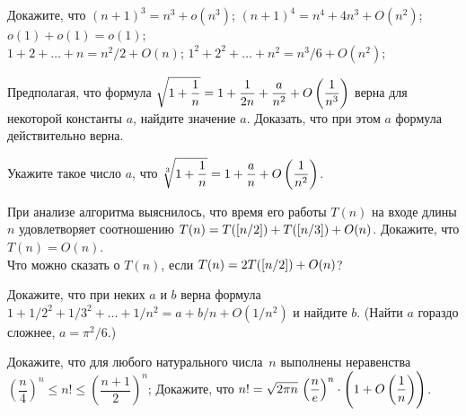 \documentclass[a4paper,12pt]{article}
\begin{document}
Докажите, что
$(n+1)^3 = n^3 + o(n^3)$;
$(n+1)^4 = n^4 + 4 n^3 + O(n^2)$;
$o(1) + o(1) = o(1)$;
\\
$1 + 2 + \ldots + n = n^2/2 + O(n)$;
$1^2 + 2^2 + \ldots + n^2 = n^3/6 + O(n^2)$;

Предполагая, что формула $\sqrt{1+\dfrac1n} = 1 + \dfrac{1}{2n} + \dfrac{a}{n^2} + O\left(\dfrac{1}{n^3}\right)$ верна для некоторой константы $a$, найдите значение $a$.
 Доказать, что при этом $a$ формула действительно верна.

Укажите такое число $a$, что $\sqrt[3]{1+\dfrac1n} = 1 + \dfrac{a}{n} + O\left(\dfrac{1}{n^2}\right)$.

При анализе алгоритма выяснилось, что время его работы $T(n)$ на входе длины $n$ удовлетворяет соотношению $T(n) = T(\left[n/2\right]) + T(\left[n/3\right]) + O(n)$. Докажите, что $T(n) = O(n)$.
\\
Что можно сказать о $T(n)$, если $T(n) = 2T(\left[n/2\right]) + O(n)$?

Докажите, что при неких $a$ и $b$ верна формула 
$1 + 1/2^2 + 1/3^2 + \ldots + 1/n^2 = a + b/n + O(1/n^2)$ и найдите $b$.
(Найти $a$ гораздо сложнее, $a=\pi^2/6$.)


Докажите, что для любого натурального числа~$n$ выполнены неравенства $\left(\dfrac n4\right)^n\leqslant n!\leqslant\left(\dfrac{n+1}2\right)^n$;
Докажите, что $n! = \sqrt{2\pi n}\,\left(\dfrac{n}{e}\right)^n \cdot \Biggl(1 + O\left(\dfrac{1}{n}\right)\Biggr)$.



\end{document}
